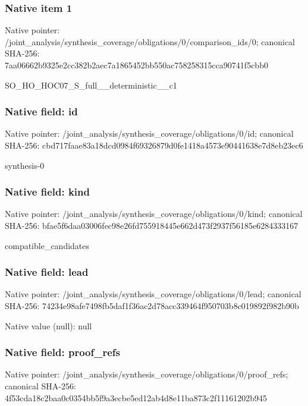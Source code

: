 \documentclass[10pt,a4paper]{article}
\begin{document}
\subsubsection{Native item 1}
Native pointer: /joint\_\allowbreak{}analysis/synthesis\_\allowbreak{}coverage/obligations/0/comparison\_\allowbreak{}ids/0; canonical SHA-256: 7aa06662b9325e2cc382b2aec7a1865452bb550ac758258315cca90741f5cbb0

\begingroup\raggedright\sloppy SO\_\allowbreak{}HO\_\allowbreak{}HOC07\_\allowbreak{}S\_\allowbreak{}full\_\allowbreak{}\_\allowbreak{}deterministic\_\allowbreak{}\_\allowbreak{}c1\par\endgroup

\subsubsection{Native field: id}
Native pointer: /joint\_\allowbreak{}analysis/synthesis\_\allowbreak{}coverage/obligations/0/id; canonical SHA-256: cbd717faae83a18dcd0984f69326879d0fe1418a4573e90441638e7d8eb23ec6

\begingroup\raggedright\sloppy synthesis-0\par\endgroup

\subsubsection{Native field: kind}
Native pointer: /joint\_\allowbreak{}analysis/synthesis\_\allowbreak{}coverage/obligations/0/kind; canonical SHA-256: bfae5f6daa03006fec98e26fd755918445e662d473f2937f56185e6284333167

\begingroup\raggedright\sloppy compatible\_\allowbreak{}candidates\par\endgroup

\subsubsection{Native field: lead}
Native pointer: /joint\_\allowbreak{}analysis/synthesis\_\allowbreak{}coverage/obligations/0/lead; canonical SHA-256: 74234e98afe7498fb5daf1f36ac2d78acc339464f950703b8c019892f982b90b

Native value (null): null

\subsubsection{Native field: proof\_\allowbreak{}refs}
Native pointer: /joint\_\allowbreak{}analysis/synthesis\_\allowbreak{}coverage/obligations/0/proof\_\allowbreak{}refs; canonical SHA-256: 4f53cda18c2baa0c0354bb5f9a3ecbe5ed12ab4d8e11ba873c2f11161202b945
\end{document}
